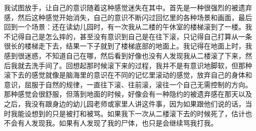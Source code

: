 我试图放手，让自己的意识随着这种感觉迷失在其中。首先是一种很强烈的被遗弃感，然后这种感觉开始消失，自己的意识不断闪过回忆里的各种场景和画面，最后回到一个场景：还在读幼儿园时，有一次我从二楼的午休室的楼梯滚到了一楼。我不记得自己是怎么摔的，甚至没有意识到自己是在往下滚，只记得自己打算从一条很长的楼梯走下去，结果一下子就到了楼梯底部的地面上。我记得在地面上时，我感到很迷惑，不知道自己在哪，然后看到好像也没有人发现我从二楼滚了下来，然后我就去洗手间了。回想起那时候滚下来的过程，我并不是有意识地脚软，但那种滚下去的感觉就像是脑海里的意识在不同的记忆里滚动的感觉，放弃自己的身体和意识，屈服于自然的规律，一直往下滚、往前滚，滚往一个自己无需控制的方向。那种感觉会很舒服，但落到地面的时候，好像会有一种隐约的被遗弃感\pozhehao{}在那天以及之后，我没有跟身边的幼儿园老师或家里人讲这件事，因为如果跟他们说的话，当时我能设想到的只是被打和被骂。如果我下一次从二楼滚下去的时候死了，估计也不会有人发现我。如果有人发现了我的尸体，也只是会继续骂我打我。


